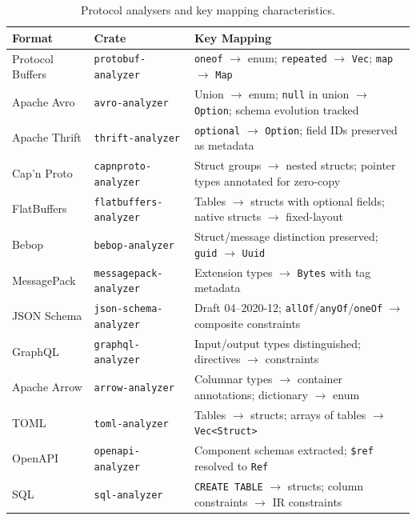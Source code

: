 \documentclass[11pt,a4paper]{article}
\theoremstyle{definition}
\theoremstyle{remark}
\begin{document}
\begin{table}[ht]
\centering
\caption{Protocol analysers and key mapping characteristics.}
\label{tab:analysers}
\begin{tabular}{@{}llp{5.5cm}@{}}
\toprule
\textbf{Format} & \textbf{Crate} & \textbf{Key Mapping} \\
\midrule
Protocol Buffers & \texttt{protobuf-analyzer} &
  \texttt{oneof} $\to$ enum; \texttt{repeated} $\to$ \texttt{Vec};
  \texttt{map} $\to$ \texttt{Map} \\
Apache Avro & \texttt{avro-analyzer} &
  Union $\to$ enum; \texttt{null} in union $\to$ \texttt{Option};
  schema evolution tracked \\
Apache Thrift & \texttt{thrift-analyzer} &
  \texttt{optional} $\to$ \texttt{Option}; field IDs preserved as
  metadata \\
Cap'n Proto & \texttt{capnproto-analyzer} &
  Struct groups $\to$ nested structs; pointer types annotated for
  zero-copy \\
FlatBuffers & \texttt{flatbuffers-analyzer} &
  Tables $\to$ structs with optional fields; native structs $\to$
  fixed-layout \\
Bebop & \texttt{bebop-analyzer} &
  Struct/message distinction preserved; \texttt{guid} $\to$
  \texttt{Uuid} \\
MessagePack & \texttt{messagepack-analyzer} &
  Extension types $\to$ \texttt{Bytes} with tag metadata \\
JSON Schema & \texttt{json-schema-analyzer} &
  Draft 04--2020-12; \texttt{allOf}/\texttt{anyOf}/\texttt{oneOf}
  $\to$ composite constraints \\
GraphQL & \texttt{graphql-analyzer} &
  Input/output types distinguished; directives $\to$ constraints \\
Apache Arrow & \texttt{arrow-analyzer} &
  Columnar types $\to$ container annotations; dictionary $\to$ enum \\
TOML & \texttt{toml-analyzer} &
  Tables $\to$ structs; arrays of tables $\to$ \texttt{Vec<Struct>} \\
OpenAPI & \texttt{openapi-analyzer} &
  Component schemas extracted; \texttt{\$ref} resolved to
  \texttt{Ref} \\
SQL & \texttt{sql-analyzer} &
  \texttt{CREATE TABLE} $\to$ structs; column constraints $\to$ IR
  constraints \\
\bottomrule
\end{tabular}
\end{table}
\end{document}
